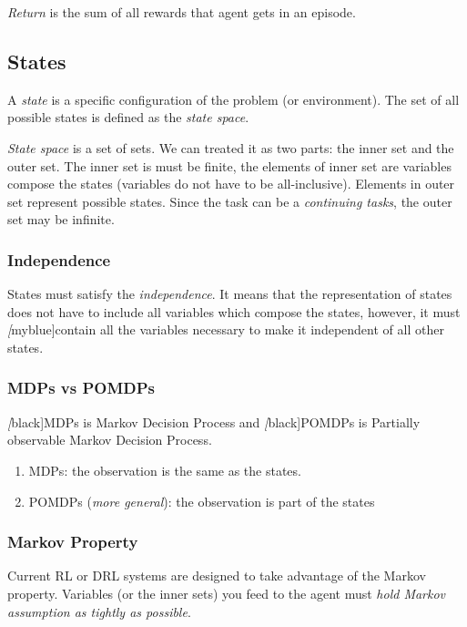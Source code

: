     \emph{Return} is the sum of all rewards that agent gets in an episode. \par

  \subsection{States}

    A \emph{state} is a specific configuration of the problem (or environment). The set of all possible states is defined as
    the \emph{state space}. \par \emph{State space} is a set of sets. We can treated it as two parts: the inner set and the
    outer set. The inner set is must be finite, the elements of inner set are variables compose the states (variables do not
    have to be all-inclusive). Elements in outer set represent possible states. Since the task can be a {\itshape continuing
        tasks}, the outer set may be infinite.

    \subsubsection*{Independence} States must satisfy the \emph{independence}. It means that the representation of states
      does not have to include all variables which compose the states, however, it must \emph[myblue]{contain all the
        variables necessary to make it independent of all other states}. \par

    \subsubsection*{MDPs vs POMDPs} \emph[black]{MDPs} is Markov Decision Process and \emph[black]{POMDPs} is Partially
      observable Markov Decision Process. \par
      \begin{enumerate}
        \item
              MDPs: the observation is the same as the states.
        \item
              POMDPs ({\itshape more general}): the observation is part of the states
      \end{enumerate}

    \subsubsection*{Markov Property} Current RL or DRL systems are designed to take advantage of the Markov property.
      Variables (or the inner sets) you feed to the agent must \emph{hold Markov assumption as tightly as possible}.

